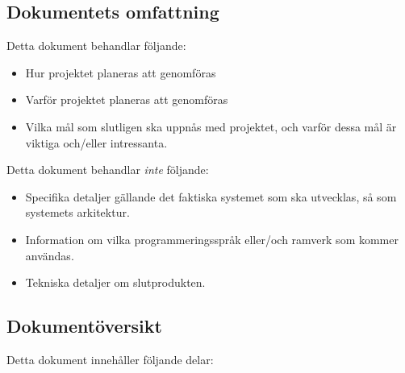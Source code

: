 \documentclass[11pt]{article}
\begin{document}
\subsection{Dokumentets omfattning}
\label{sec:orga004008}
Detta dokument behandlar följande:

\begin{itemize}
\item Hur projektet planeras att genomföras

\item Varför projektet planeras att genomföras

\item Vilka mål som slutligen ska uppnås med projektet, och varför dessa
mål är viktiga och/eller intressanta.
\end{itemize}

Detta dokument behandlar \emph{inte} följande:

\begin{itemize}
\item Specifika detaljer gällande det faktiska systemet som ska utvecklas,
så som systemets arkitektur.

\item Information om vilka programmeringsspråk eller/och ramverk som kommer
användas.

\item Tekniska detaljer om slutprodukten.
\end{itemize}

\subsection{Dokumentöversikt}
\label{sec:org7ca83ef}
Detta dokument innehåller följande delar:
\end{document}
